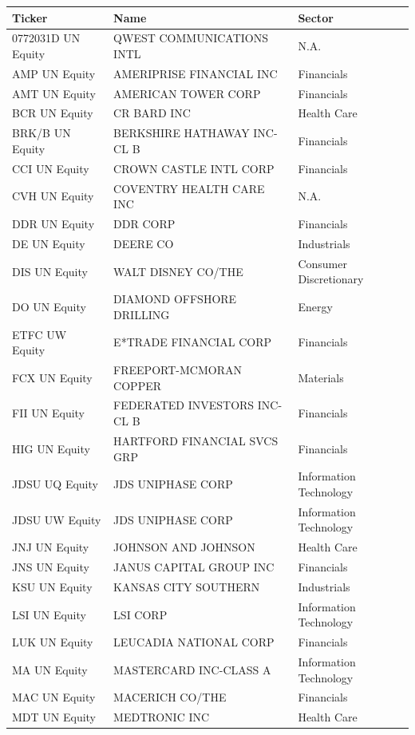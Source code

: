 \documentclass[11pt,a4,twosided,singlespacing,titlepagenumber=on]{scrreprt}
\numberwithin{equation}{chapter} %
\theoremstyle{remark}
\begin{document}
\begin{table}[H]
\centering
\begin{tabular}{lll}
\hline
\multicolumn{1}{|l|}{Ticker}     & \multicolumn{1}{|l|}{Name} & \multicolumn{1}{l|}{Sector}\\ \hline
0772031D UN Equity & QWEST COMMUNICATIONS INTL & N.A. \\
AMP UN Equity & AMERIPRISE FINANCIAL INC & Financials \\
AMT UN Equity & AMERICAN TOWER CORP & Financials \\
BCR UN Equity & CR BARD INC & Health Care \\
BRK/B UN Equity & BERKSHIRE HATHAWAY INC-CL B & Financials \\
CCI UN Equity & CROWN CASTLE INTL CORP & Financials \\
CVH UN Equity & COVENTRY HEALTH CARE INC & N.A. \\
DDR UN Equity & DDR CORP & Financials \\
DE UN Equity & DEERE CO & Industrials \\
DIS UN Equity & WALT DISNEY CO/THE & Consumer Discretionary \\
DO UN Equity & DIAMOND OFFSHORE DRILLING & Energy \\
ETFC UW Equity & E*TRADE FINANCIAL CORP & Financials \\
FCX UN Equity & FREEPORT-MCMORAN COPPER & Materials \\
FII UN Equity & FEDERATED INVESTORS INC-CL B & Financials \\
HIG UN Equity & HARTFORD FINANCIAL SVCS GRP & Financials \\
JDSU UQ Equity & JDS UNIPHASE CORP & Information Technology \\
JDSU UW Equity & JDS UNIPHASE CORP & Information Technology \\
JNJ UN Equity & JOHNSON AND JOHNSON & Health Care \\
JNS UN Equity & JANUS CAPITAL GROUP INC & Financials \\
KSU UN Equity & KANSAS CITY SOUTHERN & Industrials \\
LSI UN Equity & LSI CORP & Information Technology \\
LUK UN Equity & LEUCADIA NATIONAL CORP & Financials \\
MA UN Equity & MASTERCARD INC-CLASS A & Information Technology \\
MAC UN Equity & MACERICH CO/THE & Financials \\
MDT UN Equity & MEDTRONIC INC & Health Care \\

\end{tabular}
\end{table}
\end{document}
